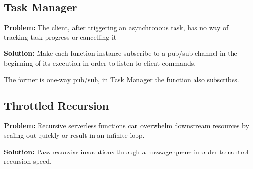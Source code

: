 \subsection{Task Manager} \label{subsec:taskManager}

\textbf{Problem:} The client, after triggering an asynchronous task, has no way of tracking task progress or cancelling it.

\textbf{Solution:} Make each function instance subscribe to a pub/sub channel in the beginning of its execution in order to listen to client commands.

The former is one-way pub/sub, in Task Manager the function also subscribes.

\subsection{Throttled Recursion} \label{subsec:throttledRecursion}

\textbf{Problem:} Recursive serverless functions can overwhelm downstream resources by scaling out quickly or result in an infinite loop.

\textbf{Solution:} Pass recursive invocations through a message queue in order to control recursion speed.
